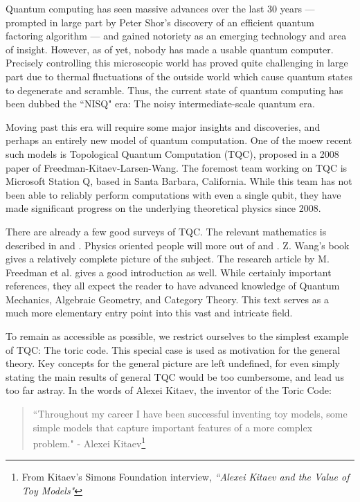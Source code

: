 \documentclass{article}
\theoremstyle{definition}
\numberwithin{figure}{section}
\begin{document}
Quantum computing has seen massive advances over the last 30 years — prompted in large part by Peter Shor's discovery of an efficient quantum factoring algorithm \cite{shor1994algorithms} — and gained notoriety as an emerging technology and area of insight. However, as of yet, nobody has made a usable quantum computer. Precisely controlling this microscopic world has proved quite challenging in large part due to thermal fluctuations of the outside world which cause quantum states to degenerate and scramble. Thus, the current state of quantum computing has been dubbed the ``NISQ" era: The noisy intermediate-scale quantum era.

Moving past this era will require some major insights and discoveries, and perhaps an entirely new model of quantum computation. One of the moew recent such models is Topological Quantum Computation (TQC), proposed in a 2008 paper of Freedman-Kitaev-Larsen-Wang. The foremost team working on TQC is Microsoft Station Q, based in Santa Barbara, California. While this team has not been able to reliably perform computations with even a single qubit, they have made significant progress on the underlying theoretical physics since 2008.

There are already a few good surveys of TQC. The relevant mathematics is described in \cite{bakalov2001lectures} and  \cite{rowell2018mathematics}. Physics oriented people will more out of \cite{preskill1999lecture} and \cite{nayak2008non}. Z. Wang's book \cite{wang2010topological} gives a relatively complete picture of the subject. The research article by M. Freedman et al. \cite{freedman2002simulation} gives a good introduction as well. While certainly important references, they all expect the reader to have advanced knowledge of Quantum Mechanics, Algebraic Geometry, and Category Theory. This text serves as a much more elementary entry point into this vast and intricate field.

To remain as accessible as possible, we restrict ourselves to the simplest example of TQC: The toric code. This special case is used as motivation for the general theory. Key concepts for the general picture are left undefined, for even simply stating the main results of general TQC would be too cumbersome, and lead us too far astray. In the words of Alexei Kitaev, the inventor of the Toric Code:

\begin{quote}
``Throughout my career I have been successful inventing toy models, some simple models that capture important features of a more complex problem." - Alexei Kitaev\footnote{From Kitaev's Simons Foundation interview, \textit{``Alexei Kitaev and the Value of Toy Models"}}
\end{quote}
\end{document}
